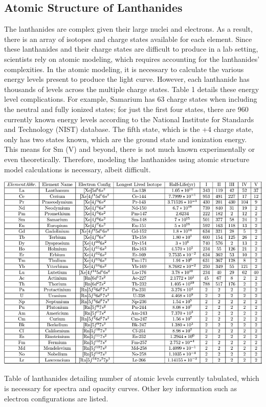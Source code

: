 \documentclass[11pt,a4paper]{article}
\begin{document}
\subsection{Atomic Structure of Lanthanides}

The lanthanides are complex given their large nuclei and electrons. As a result, there is an array of isotopes and charge states available for each element. Since these lanthanides and their charge states are difficult to produce in a lab setting, scientists rely on atomic modeling, which requires accounting for the lanthanides' complexities. In the atomic modeling, it is necessary to calculate the various energy levels present to produce the light curve. However, each lanthanide has thousands of levels across the multiple charge states. Table 1 details these energy level complications. For example, Samarium has 63 charge states when including the neutral and fully ionized states; for just the first four states, there are 960 currently known energy levels according to the National Institute for Standards and Technology (NIST) database. The fifth state, which is the +4 charge state, only has two states known, which are the ground state and ionization energy. This means for Sm (V) and beyond, there is not much known experimentally or even theoretically. Therefore, modeling the lanthanides using atomic structure model calculations is necessary, albeit difficult. 


\begin{table}[h!]
  \includegraphics[width=1\textwidth]{level_pic.png}
  \caption{Table of lanthanides detailing number of atomic levels currently tabulated, which is necessary for spectra and opacity curves. Other key information such as electron configurations are listed. }
\end{table}
\end{document}
